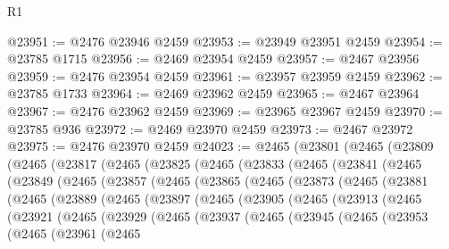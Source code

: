 \begin{lexlean}{R1}
\begin{coremodule}
@23951 := @2476 @23946 @2459
@23953 := @23949 @23951 @2459
@23954 := @23785 @1715
@23956 := @2469 @23954 @2459
@23957 := @2467 @23956
@23959 := @2476 @23954 @2459
@23961 := @23957 @23959 @2459
@23962 := @23785 @1733
@23964 := @2469 @23962 @2459
@23965 := @2467 @23964
@23967 := @2476 @23962 @2459
@23969 := @23965 @23967 @2459
@23970 := @23785 @936
@23972 := @2469 @23970 @2459
@23973 := @2467 @23972
@23975 := @2476 @23970 @2459
@24023 := @2465
    (@23801
      (@2465
        (@23809
          (@2465
            (@23817
              (@2465
                (@23825
                  (@2465
                    (@23833
                      (@2465
                        (@23841
                          (@2465
                            (@23849
                              (@2465
                                (@23857
                                  (@2465
                                    (@23865
                                      (@2465
                                        (@23873
                                          (@2465
                                            (@23881
                                              (@2465
                                                (@23889
                                                  (@2465
                                                    (@23897
                                                      (@2465
                                                        (@23905
                                                          (@2465
                                                            (@23913
                                                              (@2465
                                                                (@23921
                                                                  (@2465
                                                                    (@23929
                                                                      (@2465
                                                                        (@23937
                                                                          (@2465
                                                                            (@23945
                                                                              (@2465
                                                                                (@23953
                                                                                  (@2465
                                                                                    (@23961
                                                                                      (@2465

\end{coremodule}
\end{lexlean}
